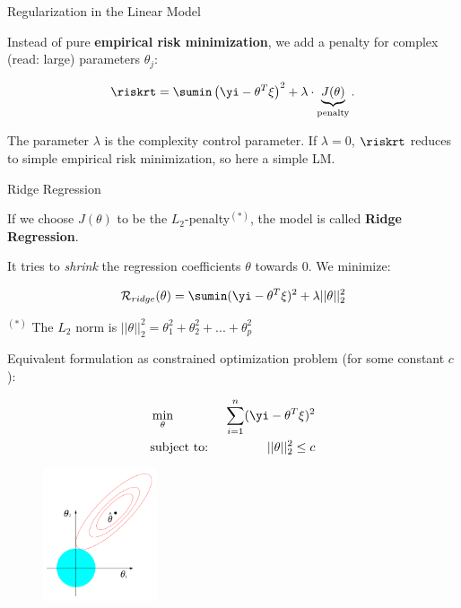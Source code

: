 \begin{frame}{Regularization in the Linear Model}

Instead of pure \textbf{empirical risk minimization}, we add a penalty
for complex (read: large) parameters \(\theta_j\):

\[
\riskrt = \sumin \left(\yi - \theta^T \xi\right)^2 + \lambda \cdot \underbrace{J(\theta)}_{\text{penalty}}.
\]

The parameter \(\lambda\) is the complexity control parameter. If
\(\lambda = 0\), \(\riskrt\) reduces to simple empirical risk
minimization, so here a simple LM.

\end{frame}

\begin{vbframe}{Ridge Regression}

If we choose \(J(\theta)\) to be the \(L_2\)-penalty\(^{(*)}\), the
model is called \textbf{Ridge Regression}.

\vfill

It tries to \emph{shrink} the regression coefficients \(\theta\) towards
\(0\). We minimize:

\[
\mathcal{R}_{ridge}(\theta) = \sumin (\yi - \theta^T \xi)^2 + \lambda ||\theta||_2^2
\]

\vfill

$^{(*)}$ The $L_2$ norm is $||\theta||_2^2 = \theta_1^2 + \theta_2^2 + ... + \theta_p^2$

\framebreak

Equivalent formulation as constrained optimization problem (for some constant $c$):

\vspace{-0.8cm}

\begin{eqnarray*}
&\min_{\theta}& \sum_{i=1}^n (\yi - \theta^T \xi)^2 \\
&\text{subject to: }& ||\theta||_2^2  \leq c \\
\end{eqnarray*}

\begin{figure}
\center
\includegraphics[width=0.3\textwidth]{plots/ridge.png}\\
\end{figure}

\end{vbframe}


